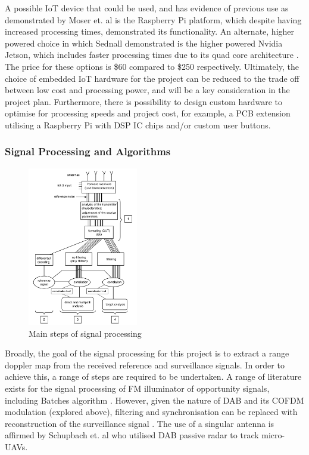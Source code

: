 \documentclass[12pt,a4paper]{article}
\begin{document}
\noindent A possible IoT device that could be used, and has evidence of previous use as demonstrated by Moser et. al \cite{IOTpassiveRadar} is the Raspberry Pi platform, which despite having increased processing times, demonstrated its functionality. An alternate, higher powered choice in which Sednall demonstrated is the higher powered Nvidia Jetson, which includes faster processing times due to its quad core architecture \cite{FMlowCost}. The price for these options is \$60 compared to \$250 respectively. Ultimately, the choice of embedded IoT hardware for the project can be reduced to the trade off between low cost and processing power, and will be a key consideration in the project plan. Furthermore, there is possibility to design custom hardware to optimise for processing speeds and project cost, for example, a PCB extension utilising a Raspberry Pi with DSP IC chips and/or custom user buttons.



\subsubsection{Signal Processing and Algorithms} 

\begin{figure} %
    \centering
    \includegraphics[width=0.43\textwidth]{DSPprocess.png}
    \caption{Main steps of signal processing \cite{detectionDABmodulation}}
    \label{fig:DSP}
\end{figure}

Broadly, the goal of the signal processing for this project is to extract a range doppler map from the received reference and surveillance signals. In order to achieve this, a range of steps are required to be undertaken. A range of literature exists for the signal processing of FM illuminator of opportunity signals, including Batches algorithm \cite{DSPfm}. However, given the nature of DAB and its COFDM modulation (explored above), filtering and synchronisation can be replaced with reconstruction of the surveillance signal \cite{DSPdab}. The use of a singular antenna is affirmed by Schupbach et. al \cite{UAVdab} who utilised DAB passive radar to track micro-UAVs.
\end{document}
